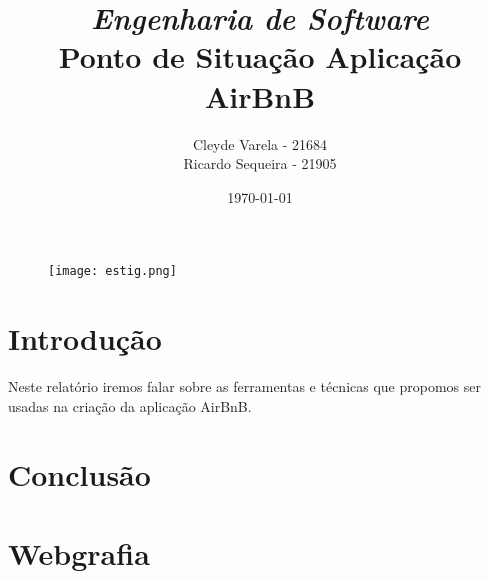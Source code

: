 \documentclass[a4paper]{article}
\title{\textit{Engenharia de Software}\\Ponto de Situação Aplicação AirBnB} %
\author{Cleyde Varela - 21684 \\ Ricardo Sequeira - 21905} %
\date{\today}
\begin{document}
\maketitle
\begin{figure}[!t]
    \texttt{[image: estig.png]}
\end{figure}
\newpage
\tableofcontents
\newpage

\section{Introdução}
Neste relatório iremos falar sobre as ferramentas e técnicas que propomos ser usadas na criação da aplicação AirBnB.


\newpage
\section{Conclusão}

\section{Webgrafia}


\end{document}
